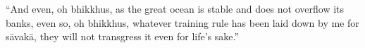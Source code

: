 
“And even, oh bhikkhus, as the great ocean
is stable and does not overflow its banks,
even so, oh bhikkhus, whatever training
rule has been laid down by me for sāvakā,
they will not transgress it even for life’s
sake.”

